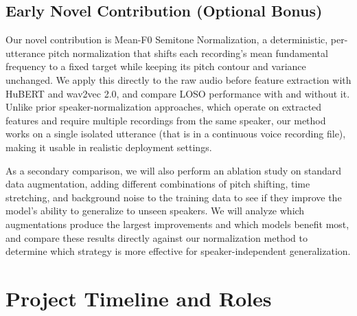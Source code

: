 \documentclass[11pt, letterpaper]{article}
\begin{document}
\subsection{Early Novel Contribution (Optional Bonus)}


Our novel contribution is Mean-F0 Semitone Normalization, a deterministic, per-utterance pitch normalization that shifts each recording's mean fundamental frequency to a fixed target while keeping its pitch contour and variance unchanged. We apply this directly to the raw audio before feature extraction with HuBERT and wav2vec 2.0, and compare LOSO performance with and without it. Unlike prior speaker-normalization approaches, which operate on extracted features and require multiple recordings from the same speaker, our method works on a single isolated utterance (that is in a continuous voice recording file), making it usable in realistic deployment settings.

As a secondary comparison, we will also perform an ablation study on standard data augmentation, adding different combinations of pitch shifting, time stretching, and background noise to the training data to see if they improve the model's ability to generalize to unseen speakers. We will analyze which augmentations produce the largest improvements and which models benefit most, and compare these results directly against our normalization method to determine which strategy is more effective for speaker-independent generalization.
\section{Project Timeline and Roles}
\end{document}

